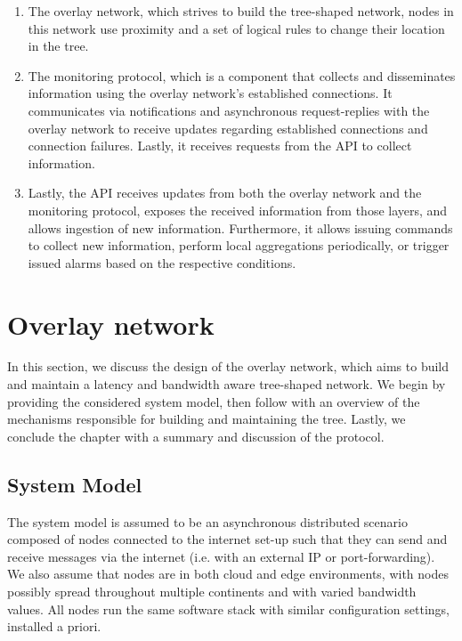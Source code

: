 \begin{enumerate}
    \item The overlay network, which strives to build the tree-shaped network, nodes in this network use proximity and a set of logical rules to change their location in the tree.

    \item The monitoring protocol, which is a component that collects and disseminates information using the overlay network's established connections. It communicates via notifications and asynchronous request-replies with the overlay network to receive updates regarding established connections and connection failures. Lastly, it receives requests from the API to collect information.

    \item Lastly, the API receives updates from both the overlay network and the monitoring protocol, exposes the received information from those layers, and allows ingestion of new information. Furthermore, it allows issuing commands to collect new information, perform local aggregations periodically, or trigger issued alarms based on the respective conditions.
\end{enumerate}

\section{Overlay network}

In this section, we discuss the design of the overlay network, which aims to build and maintain a latency and bandwidth aware tree-shaped network. We begin by providing the considered system model, then follow with an overview of the mechanisms responsible for building and maintaining the tree. Lastly, we conclude the chapter with a summary and discussion of the protocol.

\subsection{System Model}

The system model is assumed to be an asynchronous distributed scenario composed of nodes connected to the internet set-up such that they can send and receive messages via the internet (i.e. with an external IP or port-forwarding). We also assume that nodes are in both cloud and edge environments, with nodes possibly spread throughout multiple continents and with varied bandwidth values. All nodes run the same software stack with similar configuration settings, installed a priori.

